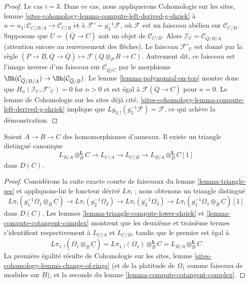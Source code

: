 \begin{proof}
\medskip\noindent
Le cas $i = 3$. Dans ce cas, nous appliquerons Cohomologie sur les sites,
lemme
\ref{sites-cohomology-lemma-compute-left-derived-g-shriek}
à $u = u_3 : \mathcal{C}_{C/B/A} \to \mathcal{C}_{C/B}$ et à
$\mathcal{F}' = g_3^{-1}\mathcal{F}$, où $\mathcal{F}$ est un faisceau
abélien sur $\mathcal{C}_{C/B}$. Supposons que
$U = (\overline{Q} \to C)$ soit un objet de $\mathcal{C}_{C/B}$. Alors
$\mathcal{I}_U = \mathcal{C}_{\overline{Q}/B/A}$ (attention encore au
renversement des flèches). Le faisceau $\mathcal{F}'_U$ est donné par la
règle $(P \to B, Q \to \overline{Q}) \mapsto \mathcal{F}(Q \otimes_P B \to C)$.
Autrement dit, ce faisceau est l'image inverse d'un faisceau sur
$\mathcal{C}_{\overline{Q}/C}$ par le morphisme
$\Sh(\mathcal{C}_{\overline{Q}/B/A}) \to \Sh(\mathcal{C}_{\overline{Q}/B})$.
Le lemme \ref{lemma-polynomial-on-top} montre donc que
$H_n(\mathcal{I}_U, \mathcal{F}'_U) = 0$ for $n > 0$
et est égal à $\mathcal{F}(\overline{Q} \to C)$ pour $n = 0$. Le lemme de
Cohomologie sur les sites déjà cité,
\ref{sites-cohomology-lemma-compute-left-derived-g-shriek}
implique que $Lg_{3, !}(g_3^{-1}\mathcal{F}) = \mathcal{F}$, ce qui achève
la démonstration.
\end{proof}

\begin{proposition}
\label{proposition-triangle}
Soient $A \to B \to C$ des homomorphismes d'anneaux. Il existe un triangle
distingué canonique
$$
L_{B/A} \otimes_B^\mathbf{L} C \to L_{C/A} \to L_{C/B} \to
L_{B/A} \otimes_B^\mathbf{L} C[1]
$$
dans $D(C)$.
\end{proposition}

\begin{proof}
Considérons la suite exacte courte de faisceaux du lemme
\ref{lemma-triangle-ses} et appliquons-lui le foncteur dérivé $L\pi_!$ ;
nous obtenons un triangle distingué
$$
L\pi_!(g_1^{-1}\Omega_1 \otimes_{\underline{B}} \underline{C}) \to
L\pi_!(g_2^{-1}\Omega_2) \to
L\pi_!(g_3^{-1}\Omega_3) \to
L\pi_!(g_1^{-1}\Omega_1 \otimes_{\underline{B}} \underline{C})[1]
$$
dans $D(C)$. Les lemmes \ref{lemma-triangle-compute-lower-shriek} et
\ref{lemma-compute-cotangent-complex}
montrent que les deuxième et troisième termes s'identifient respectivement
à $L_{C/A}$ et $L_{C/B}$, tandis que le premier est égal à
$$
L\pi_{1, !}(\Omega_1 \otimes_{\underline{B}} \underline{C}) =
L\pi_{1, !}(\Omega_1) \otimes_B^\mathbf{L} C =
L_{B/A} \otimes_B^\mathbf{L} C
$$
La première égalité résulte de Cohomologie sur les sites, lemme
\ref{sites-cohomology-lemma-change-of-rings}
(et de la platitude de $\Omega_1$ comme faisceau de modules sur
$\underline{B}$), et la seconde du lemme
\ref{lemma-compute-cotangent-complex}.
\end{proof}

